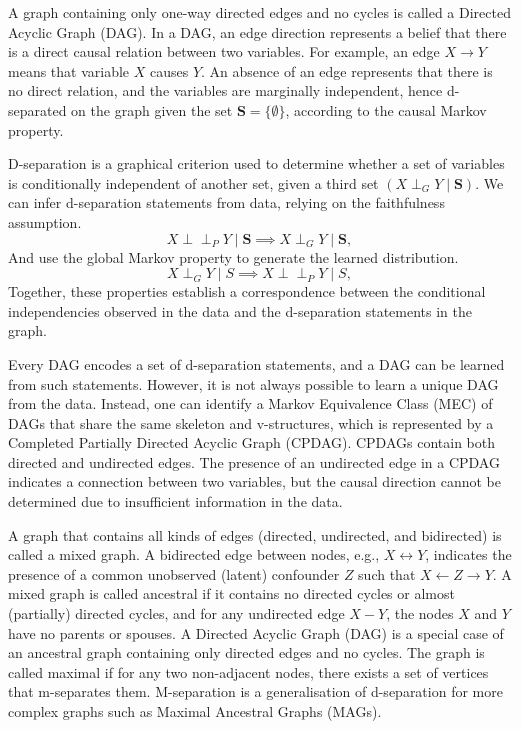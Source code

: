\documentclass[main.tex]{subfiles}
\begin{document}
A graph containing only one-way directed edges and no cycles is called a Directed Acyclic Graph (DAG). In a DAG, an edge direction represents a belief that there is a direct causal relation between two variables. For example, an edge \(X \rightarrow Y\) means that variable \(X\) causes \(Y\). An absence of an edge represents that there is no direct relation, and the variables are marginally independent, hence d-separated on the graph given the set \(\mathbf{S} = \{\emptyset\}\), according to the causal Markov property.

D-separation is a graphical criterion used to determine whether a set of variables is conditionally independent of another set, given a third set \((X \perp_{G} Y \mid \mathbf{S})\). We can infer d-separation statements from data, relying on the faithfulness assumption.
\[
X \perp\!\!\!\perp_P Y \mid \mathbf{S} \implies X \perp_G Y \mid \mathbf{S},
\] And use the global Markov property to generate the learned distribution.
\[
X \perp_G Y \mid S \implies X \perp\!\!\!\perp_P Y \mid S,
\]
Together, these properties establish a correspondence between the conditional independencies observed in the data and the d-separation statements in the graph.

Every DAG encodes a set of d-separation statements, and a DAG can be learned from such statements. However, it is not always possible to learn a unique DAG from the data. Instead, one can identify a Markov Equivalence Class (MEC) of DAGs that share the same skeleton and v-structures, which is represented by a Completed Partially Directed Acyclic Graph (CPDAG). CPDAGs contain both directed and undirected edges. The presence of an undirected edge in a CPDAG indicates a connection between two variables, but the causal direction cannot be determined due to insufficient information in the data.

A graph that contains all kinds of edges (directed, undirected, and bidirected) is called a mixed graph. A bidirected edge between nodes, e.g., \( X \leftrightarrow Y \), indicates the presence of a common unobserved (latent) confounder \( Z \) such that \( X \leftarrow Z \rightarrow Y \). A mixed graph is called ancestral if it contains no directed cycles or almost (partially) directed cycles, and for any undirected edge \( X - Y \), the nodes \( X \) and \( Y \) have no parents or spouses. A Directed Acyclic Graph (DAG) is a special case of an ancestral graph containing only directed edges and no cycles. The graph is called maximal if for any two non-adjacent nodes, there exists a set of vertices that m-separates them. M-separation is a generalisation of d-separation for more complex graphs such as Maximal Ancestral Graphs (MAGs). 
\end{document}
